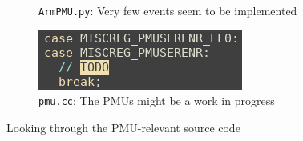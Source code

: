 \begin{figure}[H]
\begin{subfigure}{0.64\textwidth}
        \caption{\texttt{ArmPMU.py}: Very few events seem to be implemented}
    \end{subfigure}
    \hfill
    \begin{subfigure}{0.35\textwidth}
        \centering
        \includegraphics[width=\linewidth]{screenshots/sim-pmu/pmu-todo.png}
        \caption{\texttt{pmu.cc}: The PMUs might be a work in progress}
    \end{subfigure}
    \caption{Looking through the PMU-relevant source code}
    \label{fig:pmu-src}
\end{figure}
